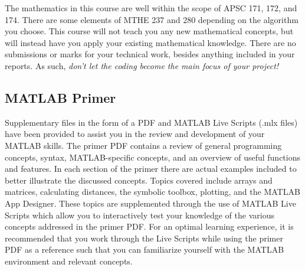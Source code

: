 \documentclass[../CourseManual.tex]{subfiles}
\begin{document}
The mathematics in this course are well within the scope of APSC 171, 172, and 174. There are some elements of MTHE 237 and 280 depending on the algorithm you choose. This course will not teach you any new mathematical concepts, but will instead have you apply your existing mathematical knowledge. There are no submissions or marks for your technical work, besides anything included in your reports. As such, \textit{don't let the coding become the main focus of your project!}

\subsection{MATLAB Primer}
Supplementary files in the form of a PDF and MATLAB Live Scripts (.mlx files) have been provided to assist you in the review and development of your MATLAB skills. The primer PDF contains a review of general programming concepts, syntax, MATLAB-specific concepts, and an overview of useful functions and features.  In each section of the primer there are actual examples included to better illustrate the discussed concepts. Topics covered include arrays and matrices, calculating distances, the symbolic toolbox, plotting, and the MATLAB App Designer. These topics are supplemented through the use of MATLAB Live Scripts which allow you to interactively test your knowledge of the various concepts addressed in the primer PDF. For an optimal learning experience, it is recommended that you work through the Live Scripts while using the primer PDF as a reference such that you can familiarize yourself with the MATLAB environment and relevant concepts.\\
\end{document}
